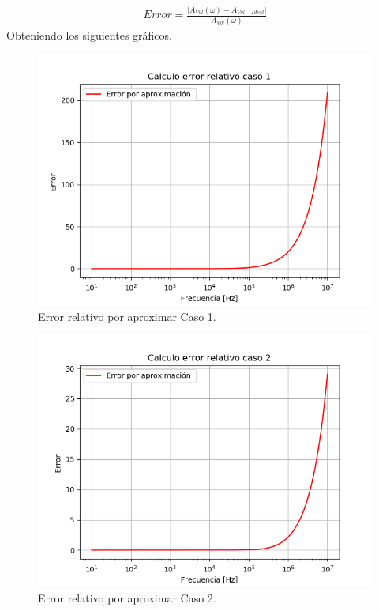 \begin{align}
	Error = \frac{|A_{Vol}(\omega)-A_{Vol-Ideal}|}{A_{Vol}(\omega)}
\end{align}
Obteniendo los siguientes gráficos.
\begin{figure}[H]	
	\centering
	\includegraphics[width=\textwidth]{Ejercicio1/Imagenes/error1.png}
	\caption{Error relativo por aproximar Caso 1.}
	\label{fig:e1}
\end{figure}
\begin{figure}[H]	
	\centering
	\includegraphics[width=\textwidth]{Ejercicio1/Imagenes/error2.png}
	\caption{Error relativo por aproximar Caso 2.}
	\label{fig:e2}
\end{figure}
